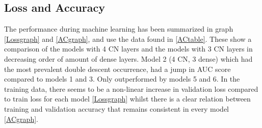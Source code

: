 \subsection{Loss and Accuracy}
The performance during machine learning has been summarized in graph \ref{Lossgraph} and \ref{ACgraph}, and use the data found in \ref{ACtable}. These show a comparison of the models with 4 CN layers and the models with 3 CN layers in decreasing order of amount of dense layers. Model 2 (4 CN, 3 dense) which had the most prevalent double descent occurrence, had a jump in AUC score compared to models 1 and 3. Only outperformed by models 5 and 6. In the training data, there seems to be a non-linear increase in validation loss compared to train loss for each model \ref{Lossgraph} whilst there is a clear relation between training and validation accuracy that remains consistent in every model \ref{ACgraph}.